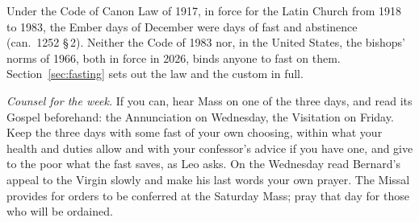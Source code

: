 Under the Code of Canon Law of 1917, in force for the Latin Church from 1918 to 1983, the Ember
days of December were days of fast and abstinence (can.~1252 \S\,2). Neither the Code of 1983 nor,
in the United States, the bishops' norms of 1966, both in force in 2026, binds anyone to fast on
them.
Section~\ref{sec:fasting} sets out the law and the custom in full.

\medskip
\noindent\textit{Counsel for the week.} If you can, hear Mass on one of the three days, and read
its Gospel beforehand: the Annunciation on Wednesday, the Visitation on Friday. Keep the three
days with some fast of your own choosing, within what your health and duties allow and with your
confessor's advice if you have one, and give to the poor what the fast saves, as Leo asks. On the
Wednesday read Bernard's appeal to the Virgin slowly and make his last words your own prayer. The
Missal provides for orders to be conferred at the Saturday Mass; pray that day for those who will be
ordained.
